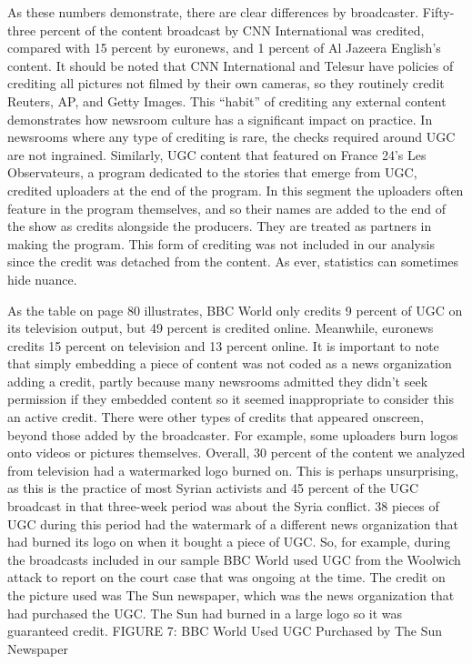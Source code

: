 \documentclass[symmetric, notoc, nobib]{towcenter-book}
\begin{document}
As these numbers demonstrate, there are clear differences by broadcaster.
Fifty-three percent of the content broadcast by CNN International was
credited, compared with 15 percent by euronews, and 1 percent of Al
Jazeera English's content. It should be noted that CNN International and
Telesur have policies of crediting all pictures not filmed by their own cameras,
so they routinely credit Reuters, AP, and Getty Images. This ``habit'' of
crediting any external content demonstrates how newsroom culture has a
significant impact on practice. In newsrooms where any type of crediting is
rare, the checks required around UGC are not ingrained.
Similarly, UGC content that featured on France 24's Les Observateurs, a
program dedicated to the stories that emerge from UGC, credited uploaders
at the end of the program. In this segment the uploaders often feature
in the program themselves, and so their names are added to the end of the
show as credits alongside the producers. They are treated as partners in
making the program. This form of crediting was not included in our analysis
since the credit was detached from the content. As ever, statistics can
sometimes hide nuance.

As the table on page 80 illustrates, BBC World only credits 9 percent of
UGC on its television output, but 49 percent is credited online. Meanwhile,
euronews credits 15 percent on television and 13 percent online. It is
important to note that simply embedding a piece of content was not coded
as a news organization adding a credit, partly because many newsrooms
admitted they didn't seek permission if they embedded content so it seemed
inappropriate to consider this an active credit.
There were other types of credits that appeared onscreen, beyond those
added by the broadcaster. For example, some uploaders burn logos onto
videos or pictures themselves. Overall, 30 percent of the content we analyzed
from television had a watermarked logo burned on. This is perhaps
unsurprising, as this is the practice of most Syrian activists and 45 percent
of the UGC broadcast in that three-week period was about the Syria conflict.
38 pieces of UGC during this period had the watermark of a different
news organization that had burned its logo on when it bought a piece of
UGC. So, for example, during the broadcasts included in our sample BBC
World used UGC from the Woolwich attack to report on the court case that
was ongoing at the time. The credit on the picture used was The Sun newspaper,
which was the news organization that had purchased the UGC. The
Sun had burned in a large logo so it was guaranteed credit.
FIGURE 7: BBC World Used UGC Purchased by The Sun Newspaper
\end{document}
